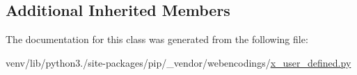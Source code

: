 \subsection*{Additional Inherited Members}


The documentation for this class was generated from the following file\+:\begin{DoxyCompactItemize}
\item 
venv/lib/python3./site-\/packages/pip/\+\_\+vendor/webencodings/\hyperlink{x__user__defined_8py}{x\+\_\+user\+\_\+defined.\+py}\end{DoxyCompactItemize}
